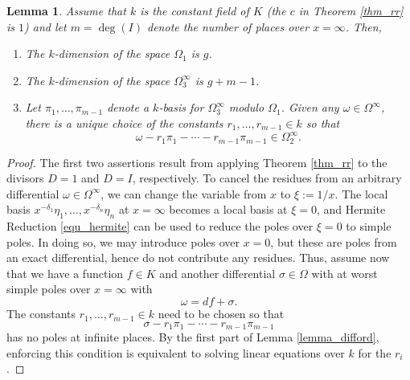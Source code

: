 \documentclass[12pt,reqno]{amsart}
\numberwithin{equation}{section}
\newtheorem{lemma}[theorem]{Lemma}
\newcommand{\op}[1]  { \operatorname{ #1 }}
\begin{document}
\begin{lemma}
\label{lemma_residue}
 Assume that $k$ is the constant field of $K$ (the $c$ in Theorem \ref{thm_rr} is $1$) and let $m=\op{deg}(I)$ denote the number of places over $x=\infty$. Then,
\begin{enumerate}
\item The $k$-dimension of the space $\Omega_1$ is $g$.
\item The $k$-dimension of the space $\Omega_3^{\infty}$ is $g+m-1$.
\item Let $\pi_1, \dots, \pi_{m-1}$ denote a $k$-basis for $\Omega_3^{\infty}$ modulo $\Omega_1$. Given any $\omega \in \Omega^{\infty}$, there is a unique choice of the constants $r_1,\dots,r_{m-1} \in k$ so that
\begin{equation*}
 \omega - r_1 \pi_1 - \cdots - r_{m-1} \pi_{m-1} \in \Omega_2^{\infty}\text{.}
\end{equation*}
\end{enumerate}
\end{lemma}
\begin{proof}
The first two assertions result from applying Theorem \ref{thm_rr} to the divisors $D=1$ and $D=I$, respectively. To cancel the residues from an arbitrary differential $\omega \in \Omega^{\infty}$, we can change the variable from $x$ to $\xi:=1/x$. The local basis $x^{-\delta_1}\eta_1,\dots,x^{-\delta_n}\eta_n$ at $x=\infty$ becomes a local basis at $\xi=0$, and Hermite Reduction \eqref{equ_hermite} can be used to reduce the poles over $\xi=0$ to simple poles. In doing so, we may introduce poles over $x=0$, but these are poles from an exact differential, hence do not contribute any residues. Thus, assume now that we have a function $f\in K$ and another differential $\sigma \in \Omega$ with at worst simple poles over $x=\infty$ with
\begin{equation*}
 \omega = df + \sigma\text{.}
\end{equation*}
The constants $r_1,\dots,r_{m-1} \in k$ need to be chosen so that
\begin{equation*}
 \sigma - r_1 \pi_1 - \cdots - r_{m-1} \pi_{m-1}
\end{equation*}
has no poles at infinite places. By the first part of Lemma \ref{lemma_difford}, enforcing this condition is equivalent to solving linear equations over $k$ for the $r_i$.
\end{proof}
\end{document}
